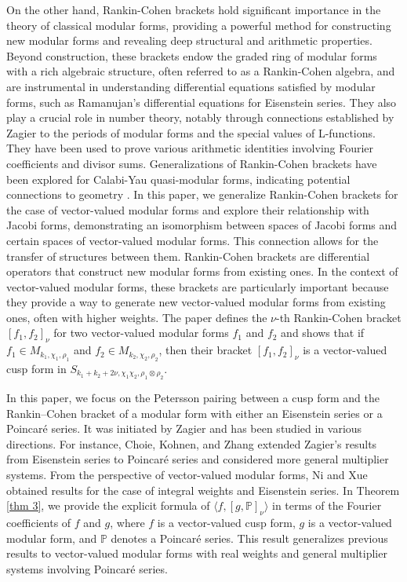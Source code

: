 \documentclass[11pt]{amsart}
\theoremstyle{definition}
\theoremstyle{remark}
\numberwithin{equation}{section}
\renewcommand{\(}{\left(}
\renewcommand{\)}{\right)}
\begin{document}
\par On the other hand, Rankin-Cohen brackets hold significant importance in the theory of classical modular forms, providing a powerful method for constructing new modular forms and revealing deep structural and arithmetic properties. Beyond construction, these brackets endow the graded ring of modular forms with a rich algebraic structure, often referred to as a Rankin-Cohen algebra, and are instrumental in understanding differential equations satisfied by modular forms, such as Ramanujan's differential equations for Eisenstein series. They also play a crucial role in number theory, notably through connections established by Zagier to the periods of modular forms and the special values of L-functions. They have been used to prove various arithmetic identities involving Fourier coefficients and divisor sums. Generalizations of Rankin-Cohen brackets have been explored for Calabi-Yau quasi-modular forms, indicating potential connections to geometry \cite{N}. In this paper, we generalize Rankin-Cohen brackets for the case of vector-valued modular forms and explore their relationship with Jacobi forms, demonstrating an isomorphism between spaces of Jacobi forms and certain spaces of vector-valued modular forms. This connection allows for the transfer of structures between them. Rankin-Cohen brackets are differential operators that construct new modular forms from existing ones. In the context of vector-valued modular forms, these brackets are particularly important because they provide a way to generate new vector-valued modular forms from existing ones, often with higher weights. The paper defines the $\nu$-th Rankin-Cohen bracket $[f_1, f_2]_\nu$ for two vector-valued modular forms $f_1$ and $f_2$ and shows that if $f_1 \in M_{k_1, \chi_1, \rho_1}$ and $f_2 \in M_{k_2, \chi_2, \rho_2}$, then their bracket $[f_1, f_2]_\nu$ is a vector-valued cusp form in $S_{k_1+k_2+2\nu, \chi_1\chi_2, \rho_1 \otimes \rho_2}$. 

In this paper, we focus on the Petersson pairing between a cusp form and the Rankin–Cohen bracket of a modular form with either an Eisenstein series or a Poincaré series.
It was initiated by Zagier \cite{ZA} and has been studied in various directions. 
For instance, Choie, Kohnen, and Zhang \cite{CKZ} extended Zagier’s results from Eisenstein series to Poincaré series and considered more general multiplier systems.
From the perspective of vector-valued modular forms, Ni and Xue \cite{NX} obtained results for the case of integral weights and Eisenstein series.
In Theorem \ref{thm 3}, we provide the explicit formula of $\langle f,[g,\mathbb{P}]_{\nu} \rangle$ in terms of the Fourier coefficients of $f$ and $g$, where $f$ is a vector-valued cusp form, $g$ is a vector-valued modular form, and $\mathbb{P}$ denotes a Poincaré series.
This result generalizes previous results to vector-valued modular forms with real weights and general multiplier systems involving Poincaré series.
\end{document}
